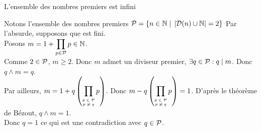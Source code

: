 \documentclass{article}
\renewenvironment{question_kholle}[2][ ]
{
	\subsection{\texorpdfstring{#2}{}}
	\notblank{#1}
	{
		\noindent #1
		\bigbreak
	}
	{}
	\begin{proof}
}
{
	\end{proof}
}
\begin{document}
\begin{question_kholle}
  {L'ensemble des nombres premiers est infini}
  
  Notons l'ensemble des nombres premiers $\mathcal P = \left\{ n \in \mathbb N \;|\; \left| \mathcal{D}(n) \cup \mathbb N \right| = 2 \right\}$
  Par l'absurde, supposons que \PRIME est fini. \\
  Posons $\displaystyle m = 1 + \prod_{p \in \mathcal P} p \in \mathbb N$. \\
  Comme $2 \in \mathcal P$, $m \geqslant 2$. Donc $m$ admet un diviseur premier, $\exists q \in \mathcal P : q \;|\; m$. Donc $q \wedge m = q$. \\
  Par ailleurs, $\displaystyle m = 1 + q \left( \prod_{\tiny \begin{matrix} p \in \mathcal P \\ p \neq q \end{matrix}} p \right)$. Donc $\displaystyle m - q \left( \prod_{\tiny \begin{matrix} p \in \mathcal P \\ p \neq q \end{matrix}} p \right) = 1$. D'après le théorème de Bézout, $q \wedge m = 1$. \\
  Donc $q = 1$ ce qui est une contradiction avec $q \in \mathcal P$.
\end{question_kholle}
\end{document}
